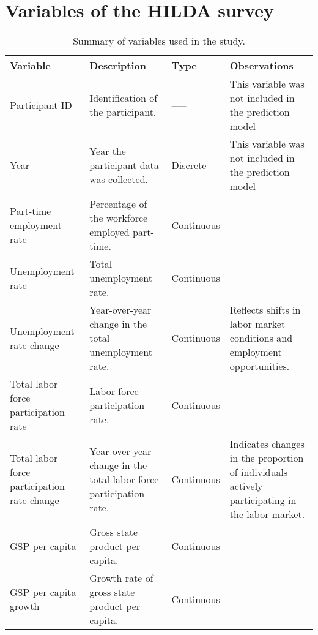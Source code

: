 \begin{sidewaystable}[!htbp]
\section{Variables of the HILDA survey}\label{AppendixA}
\centering
\caption{Summary of variables used in the study.}
\label{tab:my-table2}
\begin{adjustbox}{totalheight=0.9\textheight, width=\textwidth, keepaspectratio}
\begin{tabularx}{1.4\textwidth}{lXXX}
\toprule
\textbf{Variable}                & \textbf{Description}                                                        & \textbf{Type}            & \textbf{Observations} \\ 
\midrule
Participant ID                      & Identification of the participant.                                          & -----                     & This variable was not included in the prediction model \\
Year                    & Year the participant data was collected.                                    & Discrete                 & This variable was not included in the prediction model \\
Part-time employment rate            & Percentage of the workforce employed part-time.                             & Continuous               &  \\
Unemployment rate            & Total unemployment rate.                                                    & Continuous               &  \\
Unemployment rate change    & Year-over-year change in the total unemployment rate.                       & Continuous               & Reflects shifts in labor market conditions and employment opportunities. \\
Total labor force participation rate         & Labor force participation rate.                                             & Continuous               &  \\
Total labor force participation rate change & Year-over-year change in the total labor force participation rate.          & Continuous               & Indicates changes in the proportion of individuals actively participating in the labor market. \\
GSP per capita                   & Gross state product per capita.                                             & Continuous               &  \\
GSP per capita growth             & Growth rate of gross state product per capita.                              & Continuous               &  \\

\end{tabularx}
\end{adjustbox}
\end{sidewaystable}
